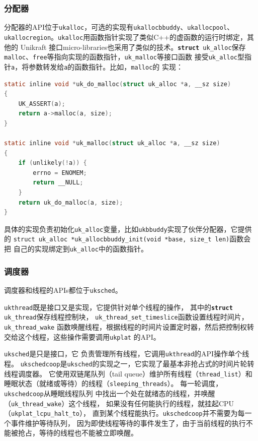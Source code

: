 \documentclass[UTF8,fontset=none,linespread=1.15]{ctexart}
\begin{document}
\subsubsection{分配器}
分配器的API位于\texttt{ukalloc}，可选的实现有\texttt{ukallocbbuddy}、\texttt{ukallocpool}、
\texttt{ukallocregion}。\texttt{ukalloc}用函数指针实现了类似C++的虚函数的运行时绑定，其他的
Unikraft 接口micro-libraries也采用了类似的技术。\texttt{\textbf{struct} uk\_alloc}保存
\texttt{malloc}、\texttt{free}等指向实现的函数指针，\texttt{uk\_malloc}等接口函数
接受\texttt{uk\_alloc}型指针\texttt{a}，将参数转发给\texttt{a}的函数指针。比如，\texttt{malloc}的
实现：
\begin{lstlisting}[language=C]
static inline void *uk_do_malloc(struct uk_alloc *a, __sz size)
{
	UK_ASSERT(a);
	return a->malloc(a, size);
}

static inline void *uk_malloc(struct uk_alloc *a, __sz size)
{
	if (unlikely(!a)) {
		errno = ENOMEM;
		return __NULL;
	}
	return uk_do_malloc(a, size);
}
\end{lstlisting}

具体的实现负责初始化\texttt{uk\_alloc}变量，比如\texttt{ukbbuddy}实现了伙伴分配器，它提供的
\texttt{struct uk\_alloc *uk\_allocbbuddy\_init(void *base, size\_t len)}函数会把
自己的实现绑定到\texttt{uk\_alloc}中的函数指针。

\subsubsection{调度器}
调度器和线程的APIs都位于\texttt{uksched}。

\texttt{ukthread}既是接口又是实现，它提供针对单个线程的操作，
其中的\texttt{\textbf{struct} uk\_thread}保存线程控制块，
\texttt{uk\_thread\_set\_timeslice}函数设置线程时间片，\texttt{uk\_thread\_wake}
函数唤醒线程，根据线程的时间片设置定时器，然后把控制权转交给这个线程，这些操作需要调用\texttt{ukplat}
的API。

\texttt{uksched}是只是接口，它
负责管理所有线程，它调用\texttt{ukthread}的API操作单个线程。
\texttt{ukschedcoop}是\texttt{uksched}的实现之一，它实现了最基本非抢占式的时间片轮转线程调度器。
它使用双链尾队列（tail queue）维护所有线程（\texttt{thread\_list}）和
睡眠状态（就绪或等待）的线程（\texttt{sleeping\_threads}）。
每一轮调度，\texttt{ukschedcoop}从睡眠线程队列
中找出一个处在就绪态的线程，并唤醒（\texttt{uk\_thread\_wake}）这个线程，
如果没有任何能执行的线程，就挂起CPU（\texttt{ukplat\_lcpu\_halt\_to}），
直到某个线程能执行。\texttt{ukschedcoop}并不需要为每一个事件维护等待队列，
因为即使线程等待的事件发生了，由于当前线程的执行不能被抢占，等待的线程也不能被立即唤醒。
\end{document}
